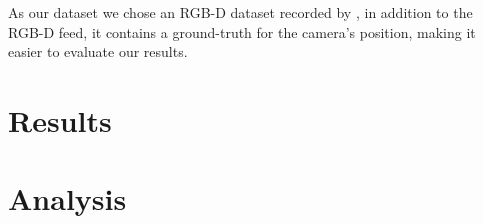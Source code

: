 \documentclass[a4paper]{article}
\begin{document}
As our dataset we chose an RGB-D dataset recorded by \cite{sturm11rss-rgbd}, in addition to the RGB-D feed, it contains a ground-truth for the camera's position, making it easier to evaluate our results.

\section{Results}




\section{Analysis}




{}

\end{document}
